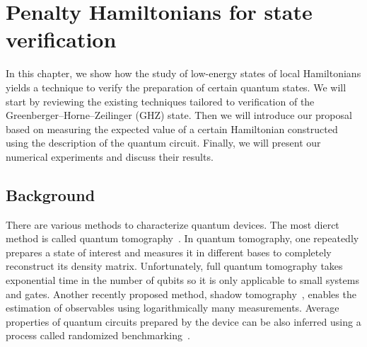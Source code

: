 \chapter{Penalty Hamiltonians for state verification}
\label{chap:ghz}

In this chapter, we show how the study of low-energy states of local Hamiltonians yields a technique to verify the preparation of certain quantum states. We will start by reviewing the existing techniques tailored to verification of the Greenberger--Horne--Zeilinger (GHZ) state. Then we will introduce our proposal based on measuring the expected value of a certain Hamiltonian constructed using the description of the quantum circuit. Finally, we will present our numerical experiments and discuss their results.


\section{Background}

There are various methods to characterize quantum devices. The most dierct method is called quantum tomography~\cite{dariano_quantum_2003,straupe_adaptive_2016}. In quantum tomography, one repeatedly prepares a state of interest and measures it in different bases to completely reconstruct its density matrix. Unfortunately, full quantum tomography takes exponential time in the number of qubits so it is only applicable to small systems and gates. Another recently proposed method, shadow tomography~\cite{aaronson_shadow_2018,huang_predicting_2020,koh_classical_2020}, enables the estimation of observables using logarithmically many measurements. Average properties of quantum circuits prepared by the device can be also inferred using a process called randomized benchmarking~\cite{magesan_robust_2011-1,knill_randomized_2008}.

